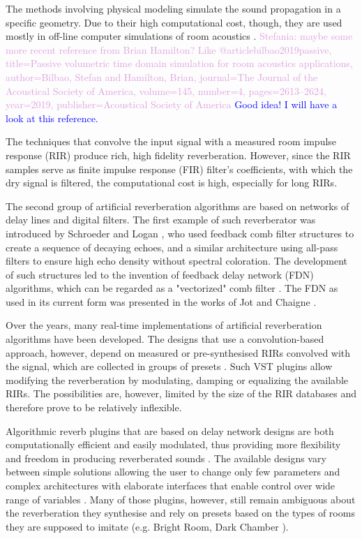 \documentclass[twoside,a4paper]{article}
\newcommand{\karolina}[1]{\textcolor{blue}{#1}}
\newcommand{\stefania}[1]{\textcolor{Plum}{Stefania: #1}}
\begin{document}
The methods involving physical modeling simulate the sound propagation in a specific geometry. Due to their high computational cost, though, they are used mostly in off-line computer simulations of room acoustics \cite{peters2012}. \stefania{maybe some more recent reference from Brian Hamilton? Like @article{bilbao2019passive, title={Passive volumetric time domain simulation for room acoustics applications}, author={Bilbao, Stefan and Hamilton, Brian}, journal={The Journal of the Acoustical Society of America}, volume={145}, number={4}, pages={2613--2624}, year={2019}, publisher={Acoustical Society of America} }} \karolina{Good idea! I will have a look at this reference.}

The techniques that convolve the input signal with a measured room impulse response (RIR) produce rich, high fidelity reverberation. However, since the RIR samples serve as finite impulse response (FIR) filter's coefficients, with which the dry signal is filtered, the computational cost is high, especially for long RIRs. 

The second group of artificial reverberation algorithms are based on networks of delay lines and digital filters. The first example of such reverberator was introduced by Schroeder and Logan \cite{schroeder}, who used feedback comb filter structures to create a sequence of decaying echoes, and a similar architecture using all-pass filters to ensure high echo density without spectral coloration. The development of such structures led to the invention of feedback delay network (FDN) algorithms, which can be regarded as a "vectorized" comb filter \cite{Valimaki:2012}. The FDN as used in its current form was presented in the works of Jot and Chaigne \cite{Jot:Chaine:1991:aes, Jot:Chaine:1996}. 

Over the years, many real-time implementations of artificial reverberation algorithms have been developed. The designs that use a convolution-based approach, however, depend on measured or pre-synthesised RIRs convolved with the signal, which are collected in groups of presets \cite{peters2012, heise2009automatic, borss2009, ableton}. Such VST plugins allow modifying the reverberation by modulating, damping or equalizing the available RIRs. The possibilities are, however, limited by the size of the RIR databases and therefore prove to be relatively inflexible. 

Algorithmic reverb plugins that are based on delay network designs are both computationally efficient and easily modulated, thus providing more flexibility and freedom in producing reverberated sounds \cite{kereliuk2018, philbert2017developing}. The available designs vary between simple solutions allowing the user to change only few parameters \cite{moffat2019} and complex architectures with elaborate interfaces that enable control over wide range of variables \cite{erbe2015}. Many of those plugins, however, still remain ambiguous about the reverberation they synthesise and rely on presets based on the types of rooms they are supposed to imitate (e.g. Bright Room, Dark Chamber \cite{valhalla}).
\end{document}
